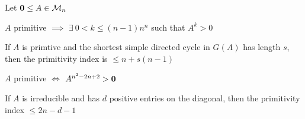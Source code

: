 \documentclass[aspectratio=169]{beamer}\usepackage[]{graphicx}\usepackage[]{xcolor}
\begin{document}
\begin{frame}
	Let $\b0\leq A\in \M_n$
\begin{theorem}
$A$ primitive $\implies$ $\exists\ 0<k\leq (n-1)n^n$ such that $A^k>0$
\end{theorem}
\vfill
\begin{theorem}
If $A$ is primtive and the shortest simple directed cycle in $G(A)$ has length $s$, then the primitivity index is $\leq n+s(n-1)$
\end{theorem}
\vfill
\begin{theorem}
$A$ primitive $\iff$ $A^{n^2-2n+2}>\b0$
\end{theorem}
\vfill
\begin{theorem}
	If $A$ is irreducible and has $d$ positive entries on the diagonal, then the primitivity index $\leq 2n-d-1$
\end{theorem}
\end{frame}
\end{document}
